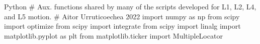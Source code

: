 \begin{minipage}[]{\linewidth}
\begin{mintedbox}[samepage]{Python}
# Aux. functions shared by many of the scripts developed for L1, L2, L4, and L5 motion.
# Aitor Urruticoechea 2022
import numpy as np
from scipy import optimize
from scipy import integrate
from scipy import linalg
import matplotlib.pyplot as plt
from matplotlib.ticker import MultipleLocator


\end{mintedbox}
\end{minipage}